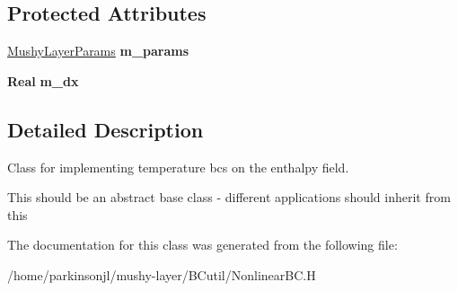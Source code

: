 \subsection*{Protected Attributes}
\begin{DoxyCompactItemize}
\item 
\mbox{\label{class_nonlinear_temperature_b_c_aae892c30977d3cfd72d0a9b75a62f54d}} 
\hyperlink{class_mushy_layer_params}{Mushy\+Layer\+Params} {\bfseries m\+\_\+params}
\item 
\mbox{\label{class_nonlinear_temperature_b_c_ac247d930ce149457c8a96003b4292f20}} 
\textbf{ Real} {\bfseries m\+\_\+dx}
\end{DoxyCompactItemize}


\subsection{Detailed Description}
Class for implementing temperature bcs on the enthalpy field. 

This should be an abstract base class -\/ different applications should inherit from this 

The documentation for this class was generated from the following file\+:\begin{DoxyCompactItemize}
\item 
/home/parkinsonjl/mushy-\/layer/\+B\+Cutil/Nonlinear\+B\+C.\+H\end{DoxyCompactItemize}
